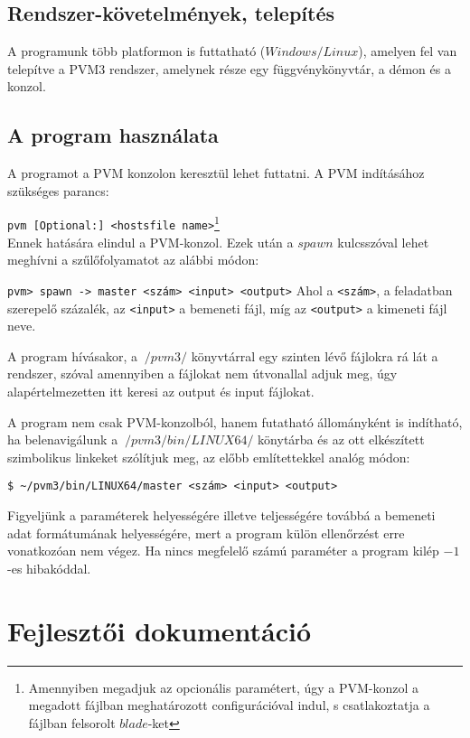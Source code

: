 \documentclass[12pt]{article}
\begin{document}
\subsection{Rendszer-követelmények, telepítés}

A programunk több platformon is futtatható ($Windows/Linux$), amelyen fel van telepítve a PVM3 rendszer, amelynek része egy függvénykönyvtár, a démon és a konzol.

\subsection{A program használata}

A programot  a PVM konzolon keresztül lehet futtatni. A PVM indításához szükséges parancs: 

\verb|pvm [Optional:] <hostsfile name>|\footnote{Amennyiben megadjuk az opcionális paramétert, úgy a PVM-konzol a megadott fájlban meghatározott configurációval indul, s csatlakoztatja a fájlban felsorolt $blade$-ket} \\
Ennek hatására elindul a PVM-konzol. Ezek után a $spawn$ kulcsszóval lehet meghívni a szűlőfolyamatot az alábbi módon: 

\verb|pvm> spawn -> master <szám> <input> <output>|
Ahol a \verb|<szám>|, a feladatban szerepelő százalék, az \verb|<input>| a bemeneti fájl, míg az \verb|<output>| a kimeneti fájl neve.

A program hívásakor, a $~/pvm3/$ könyvtárral egy szinten lévő fájlokra rá lát a rendszer, szóval amennyiben a fájlokat nem útvonallal adjuk meg, úgy alapértelmezetten itt keresi az output és input fájlokat.

A program nem csak PVM-konzolból, hanem futatható állományként is indítható, ha belenavigálunk a $~/pvm3/bin/LINUX64/$ könytárba és az ott elkészített szimbolikus linkeket szólítjuk meg, az előbb említettekkel analóg módon:

\verb|$ ~/pvm3/bin/LINUX64/master <szám> <input> <output>|

Figyeljünk a paraméterek helyességére illetve teljességére továbbá a bemeneti adat formátumának helyességére, mert a program külön ellenőrzést erre vonatkozóan nem végez. Ha nincs megfelelő számú paraméter a program kilép $-1$-es hibakóddal.

\section{Fejlesztői dokumentáció}
\end{document}
